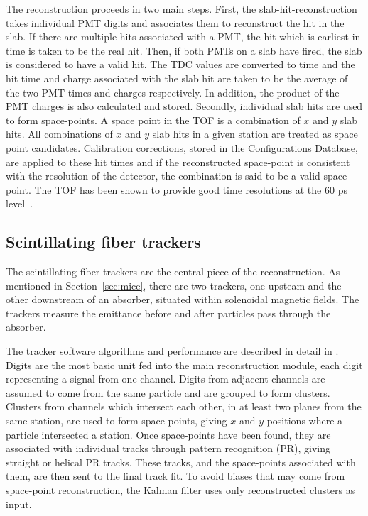 \documentclass{JINST}
\begin{document}
The reconstruction proceeds in two main steps. First, the slab-hit-reconstruction takes individual PMT digits and associates them to reconstruct the hit in the slab. If there are multiple hits associated with a PMT, the hit which is earliest in time is taken to be the real hit. Then, if both PMTs on a slab have fired, the slab is considered to have a valid hit. The TDC values are converted to time and the hit time and charge associated with the slab hit are taken to be the average of the two PMT times and charges respectively. In addition, the product of the PMT charges is also calculated and stored. Secondly, individual slab hits are used to form space-points. A space point  in the TOF is a combination of $x$ and $y$ slab hits. All combinations of $x$ and $y$ slab hits in a given station are treated as space point candidates. Calibration corrections, stored in the Configurations Database, are applied to these hit times and if the reconstructed space-point is consistent with the resolution of the detector, the combination is said to be a valid space point. The TOF has been shown to provide good time resolutions at the 60 ps level~\cite{NIMA_TOF}.



\subsection{Scintillating fiber trackers}

The scintillating fiber trackers are the central piece of the reconstruction. As mentioned in Section~\ref{sec:mice}, there are two trackers, one upsteam and the other downstream of an absorber, situated within solenoidal magnetic fields. The trackers measure the emittance before and after particles pass through the absorber.

The tracker software algorithms and performance are described in detail in \cite{TrackerSoftwareJINST}. Digits are the most basic unit fed into the main reconstruction module, each digit representing a signal from one channel. Digits from adjacent channels are assumed to come from the same particle and are grouped to form clusters. Clusters from channels which intersect each other, in at least two planes from the same station, are used to form space-points, giving $x$ and $y$ positions where a particle intersected a station. Once space-points have been found, they are associated with individual tracks through pattern recognition (PR), giving straight or helical PR tracks. These tracks, and the space-points associated with them, are then sent to the final track fit. To avoid biases that may come from space-point reconstruction, the Kalman filter uses only reconstructed clusters as input.
\end{document}
